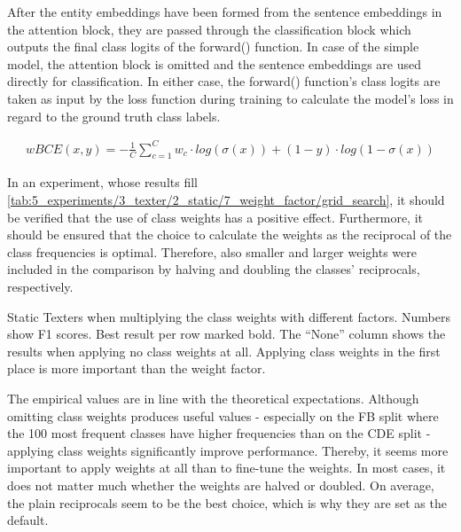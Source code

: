 After the entity embeddings have been formed from the sentence embeddings in the attention block, they are passed through the classification block which outputs the final class logits of the forward() function. In case of the simple model, the attention block is omitted and the sentence embeddings are used directly for classification. In either case, the forward() function's class logits are taken as input by the loss function during training to calculate the model's loss in regard to the ground truth class labels.


\begin{align}
    wBCE(x, y) = - \frac{1}{C} \sum_{c = 1}^C w_c \cdot log(\sigma(x)) + (1 - y) \cdot log(1 - \sigma(x))
    \label{eq:5_experiments/3_texter/2_static/7_weight_factor/wbce}
\end{align}

In an experiment, whose results fill \autoref{tab:5_experiments/3_texter/2_static/7_weight_factor/grid_search}, it should be verified that the use of class weights has a positive effect. Furthermore, it should be ensured that the choice to calculate the weights as the reciprocal of the class frequencies is optimal. Therefore, also smaller and larger weights were included in the comparison by halving and doubling the classes' reciprocals, respectively.

\begin{table}[t]
    \centering
    
    \caption{Static Texters when multiplying the class weights with different factors. Numbers show F1 scores. Best result per row marked bold. The ``None'' column shows the results when applying no class weights at all. Applying class weights in the first place is more important than the weight factor.}
    \label{tab:5_experiments/3_texter/2_static/7_weight_factor/grid_search}
\end{table}

The empirical values are in line with the theoretical expectations. Although omitting class weights produces useful values - especially on the FB split where the 100 most frequent classes have higher frequencies than on the CDE split - applying class weights significantly improve performance. Thereby, it seems more important to apply weights at all than to fine-tune the weights. In most cases, it does not matter much whether the weights are halved or doubled. On average, the plain reciprocals seem to be the best choice, which is why they are set as the default.
